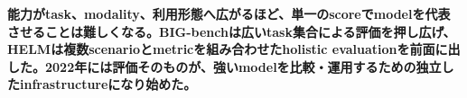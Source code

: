 \noindent\textbf{能力がtask、modality、利用形態へ広がるほど、単一のscoreでmodelを代表させることは難しくなる。BIG-benchは広いtask集合による評価を押し広げ、HELMは複数scenarioとmetricを組み合わせたholistic evaluationを前面に出した。2022年には評価そのものが、強いmodelを比較・運用するための独立したinfrastructureになり始めた。}\autocite{src-1e362767e63c,src-f02969e400b0}
